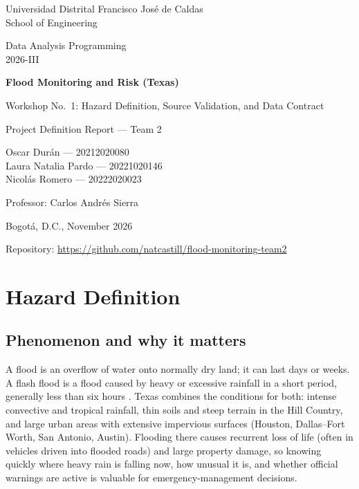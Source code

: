 \documentclass[11pt,letterpaper]{article}
\newcommand{\repo}{\url{https://github.com/natcastill/flood-monitoring-team2}}
\begin{document}
\sloppy

\begin{titlepage}
\centering
\vspace*{1.5cm}
{\large Universidad Distrital Francisco Jos\'e de Caldas\\School of Engineering \par}
\vspace{1.2cm}
{\large Data Analysis Programming 
\\2026-III\par}
\vspace{1.5cm}
{\LARGE\bfseries Flood Monitoring and Risk (Texas)\par}
\vspace{0.4cm}
{\Large Workshop No.~1: Hazard Definition, Source Validation, and Data Contract\par}
\vspace{0.4cm}
{\large Project Definition Report --- Team 2\par}
\vspace{1.8cm}
{\large
Oscar Dur\'an --- 20212020080\\
Laura Natalia Pardo --- 20221020146\\
Nicol\'as Romero --- 20222020023\par}
\vspace{1.5cm}
{\large Professor: Carlos Andr\'es Sierra\par}
\vfill
{\large Bogot\'a, D.C., November 2026\par}
\vspace{0.4cm}
{Repository: \repo\par}
\end{titlepage}

\tableofcontents
\newpage

\section{Hazard Definition}

\subsection{Phenomenon and why it matters}
A flood is an overflow of water onto normally dry land; it can last days or weeks. A flash flood is a flood caused by heavy or excessive rainfall in a short period, generally less than six hours \citep{nws_flood_definitions}. Texas combines the conditions for both: intense convective and tropical rainfall, thin soils and steep terrain in the Hill Country, and large urban areas with extensive impervious surfaces (Houston, Dallas--Fort Worth, San Antonio, Austin). Flooding there causes recurrent loss of life (often in vehicles driven into flooded roads) and large property damage, so knowing quickly where heavy rain is falling now, how unusual it is, and whether official warnings are active is valuable for emergency-management decisions.
\end{document}
